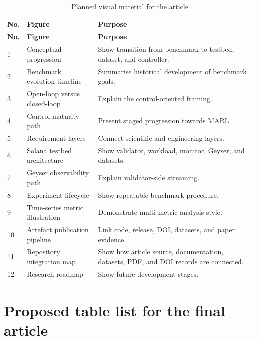 \documentclass[11pt,a4paper]{article}
\begin{document}
\begin{longtable}{L{1.2cm}L{4.0cm}L{9.0cm}}
\caption{Planned visual material for the article}\label{tab:figure-list}\\
\toprule
\textbf{No.} & \textbf{Figure} & \textbf{Purpose} \\
\midrule
\endfirsthead
\toprule
\textbf{No.} & \textbf{Figure} & \textbf{Purpose} \\
\midrule
{} & Conceptual progression & Show transition from benchmark to testbed, dataset, and controller. \\
2 & Benchmark evolution timeline & Summarise historical development of benchmark goals. \\
3 & Open-loop versus closed-loop & Explain the control-oriented framing. \\
4 & Control maturity path & Present staged progression towards MARL. \\
5 & Requirement layers & Connect scientific and engineering layers. \\
6 & Solana testbed architecture & Show validator, workload, monitor, Geyser, and datasets. \\
7 & Geyser observability path & Explain validator-side streaming. \\
8 & Experiment lifecycle & Show repeatable benchmark procedure. \\
9 & Time-series metric illustration & Demonstrate multi-metric analysis style. \\
10 & Artefact publication pipeline & Link code, release, DOI, datasets, and paper evidence. \\
11 & Repository integration map & Show how article source, documentation, datasets, PDF, and DOI records are connected. \\
12 & Research roadmap & Show future development stages. \\
\bottomrule
\end{longtable}

\section{Proposed table list for the final article}
\label{app:table-list}
\end{document}
